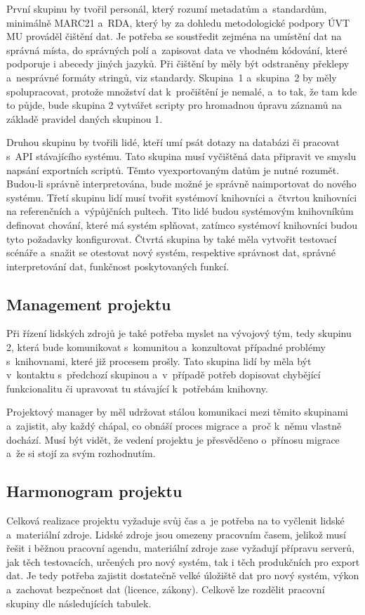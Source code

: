 \documentclass[
	11pt, oneside, printed, final, palatino
	microtype,
	table,   %
	lof,     %
	lot     %
]{fithesis3}
\begin{document}
{První skupinu by tvořil personál, který rozumí metadatům a~standardům, minimálně MARC21 a~RDA, který by za dohledu metodologické podpory ÚVT MU prováděl čištění dat. Je potřeba se soustředit zejména na umístění dat na správná místa, do správných polí a~zapisovat data ve vhodném kódování, které podporuje i abecedy jiných jazyků. Při čištění by měly být odstraněny překlepy a~nesprávné formáty stringů, viz standardy. Skupina~1 a~skupina~2 by měly spolupracovat, protože množství dat k~pročištění je nemalé, a~to tak, že tam kde to půjde, bude skupina 2 vytvářet scripty pro hromadnou úpravu záznamů na základě pravidel daných skupinou 1.

Druhou skupinu by tvořili lidé, kteří umí psát dotazy na databázi či pracovat s~API stávajícího systému. Tato skupina musí vyčištěná data připravit ve smyslu napsání exportních scriptů. Těmto vyexportovaným datům je nutné  rozumět. Budou-li správně interpretována, bude možné je správně naimportovat do nového systému.
Třetí skupinu lidí musí tvořit systémoví knihovníci a~čtvrtou knihovníci na referenčních a~výpůjčních pultech. Tito lidé budou systémovým knihovníkům definovat chování, které má systém splňovat, zatímco systémoví knihovníci budou tyto požadavky konfigurovat. Čtvrtá skupina by také měla vytvořit testovací scénáře a~snažit se otestovat nový systém, respektive správnost dat, správné interpretování dat, funkčnost poskytovaných funkcí.

\subsection{Management projektu}
Při řízení lidských zdrojů je také potřeba myslet na vývojový tým, tedy skupinu 2, která bude komunikovat s~komunitou a~konzultovat případné problémy s~knihovnami, které již procesem prošly. Tato skupina lidí by měla být v~kontaktu s~předchozí skupinou a~v~případě potřeb dopisovat chybějící funkcionalitu či upravovat tu stávající k~potřebám knihovny.

Projektový manager by měl udržovat stálou komunikaci mezi těmito skupinami a~zajistit, aby každý chápal, co obnáší proces migrace a~proč k~němu vlastně dochází. Musí být vidět, že vedení projektu je přesvědčeno o~přínosu migrace a~že si stojí za svým rozhodnutím. 

\subsection{Harmonogram projektu}
Celková realizace projektu vyžaduje svůj čas a~je potřeba na to vyčlenit lidské a~materiální zdroje. Lidské zdroje jsou omezeny pracovním časem, jelikož musí řešit i běžnou pracovní agendu, materiální zdroje zase vyžadují přípravu serverů, jak těch testovacích, určených pro nový systém, tak i těch produkčních pro export dat. Je tedy potřeba zajistit dostatečně velké úložiště dat pro nový systém, výkon a~zachovat bezpečnost dat (licence, zákony). Celkově lze rozdělit pracovní skupiny dle následujících tabulek.

}
\end{document}
